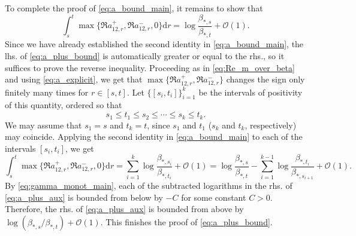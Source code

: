 \documentclass[10pt]{amsart}
\numberwithin{equation}{section}
\newcommand{\dif}{\mathrm{d}}
\begin{document}
To complete the proof of \eqref{eq:a_bound_main}, it remains to show that
\begin{equation}
\int_s^t \max\{\Re a_{12,r}^+,\Re a_{12,r}^-,0\}\dif r=\log  \frac{\beta_{*,s}}{\beta_{*,t}} + \mathcal{O}(1).\label{eq:a_plus_bound}
\end{equation}
Since we have already established the second identity in \eqref{eq:a_bound_main}, the lhs. of \eqref{eq:a_plus_bound} is automatically greater or equal to the rhs., so it suffices to prove the reverse inequality. Proceeding as in \eqref{eq:Re_m_over_beta} and using \eqref{eq:a_explicit}, we get that $\max\{\Re a_{12,r}^+,\Re a_{12,r}^-\}$ changes the sign only finitely many times for $r\in [s,t]$. Let $\{[s_i,t_i]\}_{i=1}^k$ be the intervals of positivity of this quantity, ordered so that
\begin{equation*}
s_1\le t_1\le s_2\le\cdots\le s_k\le t_k.
\end{equation*}
We may assume that $s_1=s$ and $t_k=t$, since $s_1$ and $t_1$ ($s_k$ and $t_k$, respectively) may coincide. Applying the second identity in \eqref{eq:a_bound_main} to each of the intervals $[s_i,t_i]$, we get
\begin{equation}
\int_s^t \max\{\Re a_{12,r}^+,\Re a_{12,r}^-,0\}\dif r = \sum_{i=1}^k \log \frac{\beta_{*,s_i}}{\beta_{*,t_i}} + \mathcal{O}(1) = \log \frac{\beta_{*,s}}{\beta_{*,t}} - \sum_{i=1}^{k-1} \log \frac{\beta_{*,t_i}}{\beta_{*,s_{i+1}}}+\mathcal{O}(1).
\label{eq:a_plus_aux}
\end{equation}
By \eqref{eq:gamma_monot_main}, each of the subtracted logarithms in the rhs. of \eqref{eq:a_plus_aux} is bounded from below by $-C$ for some constant $C>0$. Therefore, the rhs. of \eqref{eq:a_plus_aux} is bounded from above by $\log  (\beta_{*,s}/\beta_{*,t})+ \mathcal{O}(1)$. This finishes the proof of \eqref{eq:a_plus_bound}.
\end{document}
